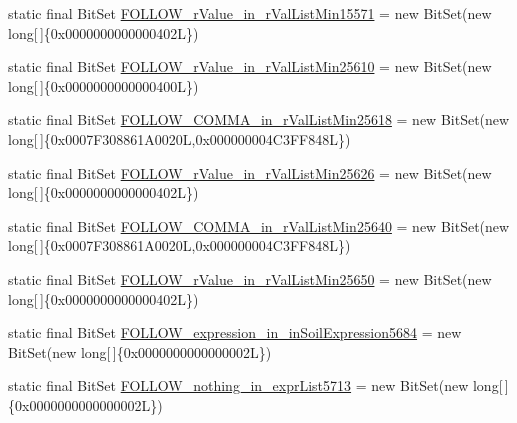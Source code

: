 \begin{DoxyCompactItemize}
\item 
static final Bit\-Set \hyperlink{classorg_1_1tzi_1_1use_1_1parser_1_1shell_1_1_shell_command_parser_a7f715d4466c2ee1c322cc051754b0954}{F\-O\-L\-L\-O\-W\-\_\-r\-Value\-\_\-in\-\_\-r\-Val\-List\-Min15571} = new Bit\-Set(new long\mbox{[}$\,$\mbox{]}\{0x0000000000000402\-L\})
\item 
static final Bit\-Set \hyperlink{classorg_1_1tzi_1_1use_1_1parser_1_1shell_1_1_shell_command_parser_a1141d7adf6eb162d72613a30b744792b}{F\-O\-L\-L\-O\-W\-\_\-r\-Value\-\_\-in\-\_\-r\-Val\-List\-Min25610} = new Bit\-Set(new long\mbox{[}$\,$\mbox{]}\{0x0000000000000400\-L\})
\item 
static final Bit\-Set \hyperlink{classorg_1_1tzi_1_1use_1_1parser_1_1shell_1_1_shell_command_parser_ad8418bc3da2de5d02de2e7a8c6cdc115}{F\-O\-L\-L\-O\-W\-\_\-\-C\-O\-M\-M\-A\-\_\-in\-\_\-r\-Val\-List\-Min25618} = new Bit\-Set(new long\mbox{[}$\,$\mbox{]}\{0x0007\-F308861\-A0020\-L,0x000000004\-C3\-F\-F848\-L\})
\item 
static final Bit\-Set \hyperlink{classorg_1_1tzi_1_1use_1_1parser_1_1shell_1_1_shell_command_parser_a44be1bddf24517f78094ccaf96c22522}{F\-O\-L\-L\-O\-W\-\_\-r\-Value\-\_\-in\-\_\-r\-Val\-List\-Min25626} = new Bit\-Set(new long\mbox{[}$\,$\mbox{]}\{0x0000000000000402\-L\})
\item 
static final Bit\-Set \hyperlink{classorg_1_1tzi_1_1use_1_1parser_1_1shell_1_1_shell_command_parser_aff13f21c10c50251cced61b17f435732}{F\-O\-L\-L\-O\-W\-\_\-\-C\-O\-M\-M\-A\-\_\-in\-\_\-r\-Val\-List\-Min25640} = new Bit\-Set(new long\mbox{[}$\,$\mbox{]}\{0x0007\-F308861\-A0020\-L,0x000000004\-C3\-F\-F848\-L\})
\item 
static final Bit\-Set \hyperlink{classorg_1_1tzi_1_1use_1_1parser_1_1shell_1_1_shell_command_parser_a036c5788caeaaa207d4744298e239dab}{F\-O\-L\-L\-O\-W\-\_\-r\-Value\-\_\-in\-\_\-r\-Val\-List\-Min25650} = new Bit\-Set(new long\mbox{[}$\,$\mbox{]}\{0x0000000000000402\-L\})
\item 
static final Bit\-Set \hyperlink{classorg_1_1tzi_1_1use_1_1parser_1_1shell_1_1_shell_command_parser_a1082254ee375668e7b03580f163d8909}{F\-O\-L\-L\-O\-W\-\_\-expression\-\_\-in\-\_\-in\-Soil\-Expression5684} = new Bit\-Set(new long\mbox{[}$\,$\mbox{]}\{0x0000000000000002\-L\})
\item 
static final Bit\-Set \hyperlink{classorg_1_1tzi_1_1use_1_1parser_1_1shell_1_1_shell_command_parser_ac6f9aa00417539790abdc294cfd22b1e}{F\-O\-L\-L\-O\-W\-\_\-nothing\-\_\-in\-\_\-expr\-List5713} = new Bit\-Set(new long\mbox{[}$\,$\mbox{]}\{0x0000000000000002\-L\})

\end{DoxyCompactItemize}
